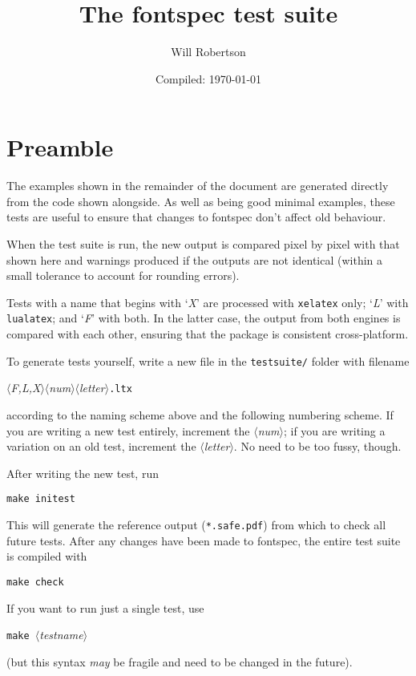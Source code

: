 \documentclass{article}
\newcommand\meta[1]{$\langle$\emph{#1}$\rangle$}
\newcommand\codeline[1]{\par{\centering#1\par}\par\noindent\ignorespaces}
\begin{document}
\title{The \textsf{fontspec} test suite}
\author{Will Robertson}
\date{Compiled: \today}
\maketitle
\thispagestyle{empty}

\section*{Preamble}

\begin{multicols}{2}\noindent
The examples shown in the remainder of the document are generated directly from the code shown alongside.
As well as being good minimal examples, these tests are useful to ensure that changes to \textsf{fontspec} don't affect old behaviour.

When the test suite is run, the new output is compared pixel by pixel with that shown here and warnings produced if the outputs are not identical (within a small tolerance to account for rounding errors).

Tests with a name that begins with `\textit X' are processed with \texttt{xelatex} only; `\textit L' with \texttt{lualatex}; and `\textit F' with both.
In the latter case, the output from both engines is compared with each other, ensuring that the package is consistent cross-platform.

To generate tests yourself, write a new file in the \texttt{testsuite/} folder with filename
\codeline{\meta{F,L,X}\meta{num}\meta{letter}\texttt{.ltx}}
according to the naming scheme above and the following numbering scheme. If you are writing a new test entirely, increment the \meta{num}; if you are writing a variation on an old test, increment the \meta{letter}. No need to be too fussy, though.

After writing the new test, run
\codeline{\texttt{make initest}}
This will generate the reference output (\texttt{*.safe.pdf}) from which to check all future tests.
After any changes have been made to \textsf{fontspec}, the entire test suite is compiled with \codeline{\texttt{make check}}
If you want to run just a single test, use
\codeline{\texttt{make }\meta{testname}}
(but this syntax \emph{may} be fragile and need to be changed in the future).
\end{multicols}


\end{document}
